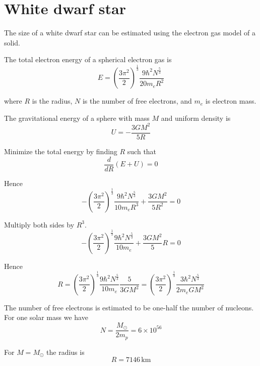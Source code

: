 


\section*{White dwarf star}

The size of a white dwarf star can be estimated using the electron gas model of a solid.

\bigskip
The total electron energy of a spherical electron gas is
\begin{equation*}
E=\left(\frac{3\pi^2}{2}\right)^\frac{1}{3}
\frac{9\hbar^2N^\frac{5}{3}}{20m_eR^2}
\end{equation*}

where $R$ is the radius, $N$ is the number of free electrons, and $m_e$ is electron mass.

\bigskip
The gravitational energy of a sphere with mass $M$ and uniform density is
\begin{equation*}
U=-\frac{3GM^2}{5R}
\end{equation*}

Minimize the total energy by finding $R$ such that
\begin{equation*}
\frac{d}{dR}(E+U)=0
\end{equation*}

Hence
\begin{equation*}
-\left(\frac{3\pi^2}{2}\right)^\frac{1}{3}
\frac{9\hbar^2N^\frac{5}{3}}{10m_eR^3}+\frac{3GM^2}{5R^2}=0
\end{equation*}

Multiply both sides by $R^3$.
\begin{equation*}
-\left(\frac{3\pi^2}{2}\right)^\frac{1}{3}
\frac{9\hbar^2N^\frac{5}{3}}{10m_e}+\frac{3GM^2}{5}R=0
\end{equation*}

Hence
\begin{equation*}
R=\left(\frac{3\pi^2}{2}\right)^\frac{1}{3}
\frac{9\hbar^2N^\frac{5}{3}}{10m_e}
\frac{5}{3GM^2}
=\left(\frac{3\pi^2}{2}\right)^\frac{1}{3}
\frac{3\hbar^2N^\frac{5}{3}}{2m_eGM^2}
\tag{1}
\end{equation*}

The number of free electrons is estimated to be one-half the number of nucleons.
For one solar mass we have
\begin{equation*}
N=\frac{M_{\odot}}{2m_p}=6\times10^{56}
\end{equation*}

For $M=M_{\odot}$ the radius is
\begin{equation*}
R=7146\,\text{km}
\end{equation*}


